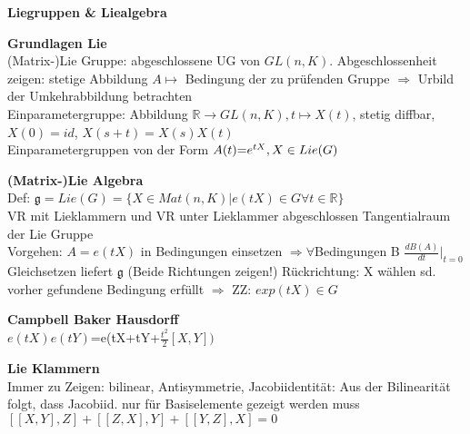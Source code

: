\documentclass[8pt, a4paper, landscape]{extarticle}
\newcommand{\tit}[1]{\textbf{#1} \\}
\newcommand{\sh}[1]{\small\textbf{#1}}
\newcommand{\eq}{\negthickspace=\negthickspace}
\newcommand{\hi}[1]{\textcolor{Cerulean}{#1}}
\newcommand{\eck}[1]{\mathfrak{#1}}
\begin{document}
\begin{multicols*}{5}
\begin{cbox}
    \sh{Liegruppen \& Liealgebra}
\end{cbox}

\begin{ibox}
    \tit{Grundlagen Lie}
    \hi{(Matrix-)Lie Gruppe}: abgeschlossene UG von $GL(n,K)$. Abgeschlossenheit zeigen: stetige Abbildung $A\mapsto$ Bedingung der zu prüfenden Gruppe $\Rightarrow$ Urbild der Umkehrabbildung betrachten\\
    \hi{Einparametergruppe}: Abbildung $\mathbb{R}\rightarrow GL(n,K), t\mapsto X(t)$, stetig diffbar, $X(0)=id$, $X(s+t)=X(s)X(t)$\\
    \textbullet Einparametergruppen von der Form $A(t)\eq e^{tX}, X\in Lie(G)$
\end{ibox}
\begin{ibox}
    \tit{(Matrix-)Lie Algebra}
    Def: $\eck{g}=Lie(G)= \{X\in Mat(n,K)| e(tX)\in G \forall t\in \mathbb{R}\}$\\
    \textbullet VR mit Lieklammern und VR unter Lieklammer abgeschlossen
    \textbullet Tangentialraum der Lie Gruppe\\
    Vorgehen: $A=e(tX)$ in Bedingungen einsetzen $\Rightarrow \forall$Bedingungen B $\frac{dB(A)}{dt}|_{t=0}$\\
    Gleichsetzen liefert $\eck{g}$ (Beide Richtungen zeigen!)
    Rückrichtung: X wählen sd. vorher gefundene Bedingung erfüllt $\Rightarrow$ ZZ: $exp(tX)\in G$
\end{ibox}
\begin{ibox}
    \tit{Campbell Baker Hausdorff}
    $e(tX)e(tY)$=e(tX+tY+$\frac{t^2}{2}[X,Y]) $
\end{ibox}
\begin{ibox}
    \tit{Lie Klammern}
    Immer zu Zeigen: bilinear, Antisymmetrie, Jacobiidentität: Aus der Bilinearität folgt, dass Jacobiid. nur für Basiselemente gezeigt werden muss\\
    \footnotesize{$[[X,Y],Z]+[[Z,X],Y]+[[Y,Z],X]=0$}
\end{ibox}


\end{multicols*}
\end{document}
